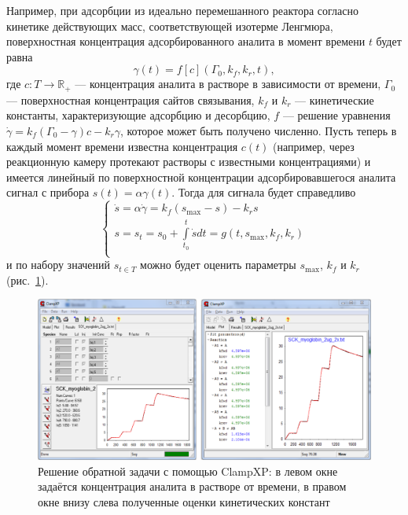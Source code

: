 \documentclass[oneside,final,12pt]{extreport}
\begin{document}
Например, при адсорбции из идеально перемешанного реактора
согласно кинетике действующих масс, соответствующей изотерме Ленгмюра,
поверхностная концентрация адсорбированного аналита
в момент времени $t$ будет равна
\begin{equation}
  \gamma\left(t\right) = f\left[c\right]\left(\Gamma_0, k_f, k_r, t\right),
\end{equation}
где $c:T\rightarrow\mathbb{R}_+$ --- концентрация аналита в растворе в зависимости от времени,
$\Gamma_0$ --- поверхностная концентрация сайтов связывания,
$k_f$ и $k_r$ --- кинетические константы, характеризующие адсорбцию и десорбцию,
$f$ --- решение уравнения
$\dot{\gamma} = k_f \left(\Gamma_0-\gamma\right) c - k_r \gamma$,
которое может быть получено численно.
Пусть теперь в каждый момент времени известна концентрация $c\left(t\right)$
(например, через реакционную камеру протекают растворы с известными концентрациями)
и имеется линейный по поверхностной концентрации адсорбировавшегося аналита
сигнал с прибора $s\left(t\right) = \alpha\gamma\left(t\right)$.
Тогда для сигнала будет справедливо
\begin{equation}
\begin{cases}
  \dot{s} = \alpha\dot{\gamma} = k_f \left(s_{\max} - s\right) - k_r s \\
  s = s_t = s_0 + \int\limits_{t_0}^{t} \dot{s} dt = g(t, s_{\max}, k_f, k_r) \\
\end{cases}
\end{equation}
и по набору значений $s_{t \in T}$ можно будет оценить параметры
$s_{\max}$, $k_f$ и $k_r$\cite{bib:FULLTEXT_inverse_example}
(рис.~\ref{fig:FULLTEXT_inverse_example}).

\begin{figure}
  \centering
  \includegraphics[width=.8\textwidth]{pic/FULLTEXT_inverse_example}
  \caption{\label{fig:FULLTEXT_inverse_example}%
    Решение обратной задачи с помощью ClampXP:
    в левом окне задаётся концентрация аналита в растворе от времени,
    в правом окне внизу слева полученные оценки кинетических констант
  }

\end{figure}
\end{document}
